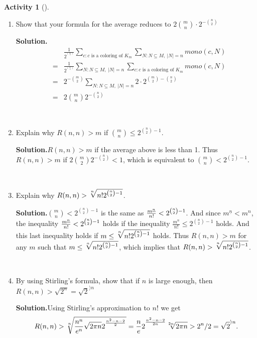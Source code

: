 \documentclass[10pt,]{book}
\theoremstyle{plain}
\theoremstyle{definition}
\newtheorem{activity}[project]{Activity}
\numberwithin{equation}{chapter}
\newcommand{\lt}{<}
\newcommand{\amp}{&}
\begin{document}
\begin{activity}[]
\begin{enumerate}[label=(\alph*)]
~\par
\item Show that your formula for the average reduces to \(2\binom{m}{n}\cdot2^{-\binom{n}{2}}\)%
\par\medskip\noindent%
\textbf{Solution.}\quad %
\begin{align*}
\amp \amp \frac{1}{2^{^\binom{m}{2}}}\sum_{c:c\mbox{~is a coloring
of~} K_m}\sum_{N:N\subseteq M,~|N|=n}{ mono}(c,N)\\
\amp =\amp \frac{1}{2^{^\binom{m}{2}}} \sum_{N:N\subseteq
M,~|N|=n}\sum_{c:c\mbox{~is a coloring of~} K_m}{ mono}(c,N)\\
\amp =\amp
2^{-\binom{m}{2}}\sum_{N:N\subseteq
M,~|N|=n}2\cdot2^{\binom{m}{2}-\binom{n}{2}}\\
\amp =\amp  2\binom{m}{n}2^{-\binom{n}{2}}
\end{align*}

~\par
\item Explain why \(R(n,n)>m\) if \(\binom{m}{n}\le 2^{\binom{n}{2} -1}\).%
\par\medskip\noindent%
\textbf{Solution.}\quad \(R(n,n)>m\) if the average above is less than 1. Thus \(R(n,n)>m\) if \(2\binom{m}{2}2^{-\binom{n}{2}}\lt 1\), which is equivalent to \(\binom{m}{n}\lt 2^{\binom{n}{2}-1}\).%

~\par
\item Explain why \(R(n,n)>\root n \of {n!2^{\binom{n}{2}-1}}\).%
\par\medskip\noindent%
\textbf{Solution.}\quad \(\binom{m}{n} \lt 2^{\binom{n}{2}-1}\) is the same as \({m^{\underline{n}}\over n!}\lt 2^{\binom{n}{2}-1}\). And since \(m^{\underline{n}}\lt m^n\), the inequality \({m^{\underline{n}}\over
n!}\lt  2^{\binom{n}{2}-1}\) holds if the inequality \(\frac{m^n}{n!}\le2^{\binom{n}{2}-1}\) holds. And this last inequality holds if \(m\le\root n
\of {n!2^{\binom{n}{2}-1}}\) holds. Thus \(R(n,n)>m\) for any \(m\) such that \(m\le\root n
\of {n!2^{\binom{n}{2}-1}}\), which implies that \(R(n,n)> \root n
\of {n!2^{\binom{n}{2}-1}}\).%

~\par
\item By using Stirling's formula, show that if \(n\) is large enough, then \(R(n,n) > \sqrt{2^n} = \sqrt{2}^{\rangle n}\)%
\par\medskip\noindent%
\textbf{Solution.}\quad Using Stirling's approximation to \(n!\) we get%
\begin{equation*}
R(n,n)>\root n \of
{\frac{n^n}{e^n}\sqrt{2\pi n}2^{^\frac{n^2-n-2}{2}}}=\frac{n}{e}2^{^\frac{n^2-n-2}{2n}}\root 2n \of{2\pi
n}>2^n/2=\sqrt{2}^{\rangle n}.
\end{equation*}
%

\end{enumerate}
\end{activity}
\typeout{************************************************}
\typeout{************************************************}
\end{document}
